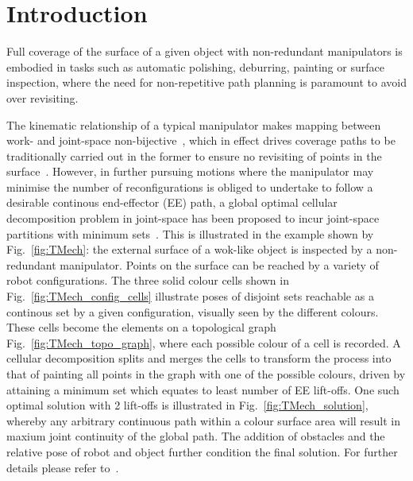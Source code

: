 \documentclass[conference]{IEEEtran}
\begin{document}
\IEEEpeerreviewmaketitle
\section{Introduction}
Full coverage of the surface of a given object with non-redundant manipulators is embodied in tasks such as 
automatic polishing, deburring, painting or surface inspection, where the need for non-repetitive path planning 
is paramount to avoid over revisiting. 

The kinematic relationship of a typical manipulator makes mapping between work- and joint-space 
non-bijective~\cite{lavalle2006planning}, which in effect drives coverage paths to be traditionally carried out in the former to 
ensure no revisiting of points in the surface~\cite{Oriolo2005Motion}. However, in further pursuing motions 
where the manipulator may minimise the number of reconfigurations is obliged to undertake to follow a desirable 
continous end-effector (EE) path, a global optimal cellular decomposition problem in joint-space has been 
proposed to incur joint-space partitions with minimum sets~\cite{Yang2020Cellular_arxiv}. This is illustrated in 
the example shown by Fig.~\ref{fig:TMech}: the external surface of a wok-like object is inspected by a 
non-redundant manipulator. Points on the surface can be reached by a variety of robot configurations. 
The three solid colour cells shown in Fig.~\ref{fig:TMech_config_cells} illustrate poses of disjoint sets reachable 
as a continous set by a given configuration, visually seen by the different colours. These cells become the elements 
on a topological graph Fig.~\ref{fig:TMech_topo_graph}, where each possible colour of a cell is recorded. 
A cellular decomposition splits and merges the cells to transform the process into that of painting all points in the 
graph with one of the possible colours, driven by attaining a minimum set which equates to least number of EE lift-offs. 
One such optimal solution with 2 lift-offs is illustrated in Fig.~\ref{fig:TMech_solution}, whereby any arbitrary 
continuous path within a colour surface area will result in maxium joint continuity of the global path. 
The addition of obstacles and the relative pose of robot and object further condition the final solution. 
For further details please refer to~\cite{Yang2020Cellular_arxiv}. 
\end{document}
